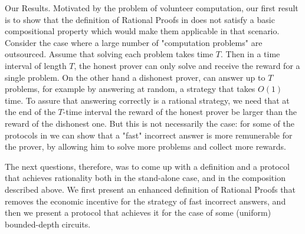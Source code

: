 \smallskip
\noindent
{\sc Our Results.} 
Motivated by the problem of volunteer computation, our first
result is to show that the definition of Rational Proofs in \cite{am,am1} does not satisfy a basic compositional property which would make them applicable 
in that scenario. 
Consider the case where a large number of "computation problems" are outsourced. Assume that solving each problem takes time $T$. Then in a time interval of length $T$, the honest prover can only solve and receive the reward for a single problem. On the other hand a dishonest prover, can answer up to $T$ problems, for example by answering at random, a strategy that takes $O(1)$ time. To assure that answering correctly is a rational strategy, we 
need that at the end of the $T$-time interval the reward of the honest prover be larger than the reward of the dishonest one. But this is not necessarily the case: for some of the protocols in \cite{am,am1,ratargs} we can show that a "fast" incorrect answer is more remunerable for the prover, by allowing him to solve more problems and collect more rewards.

The next questions, therefore, was to come up with a definition and a protocol that achieves rationality both in the stand-alone case, and in the composition
described above.  We first present an enhanced definition of Rational Proofs that removes the economic incentive  for the strategy of fast incorrect answers, and then we present a protocol that achieves it for the case of some (uniform) bounded-depth circuits.
 

